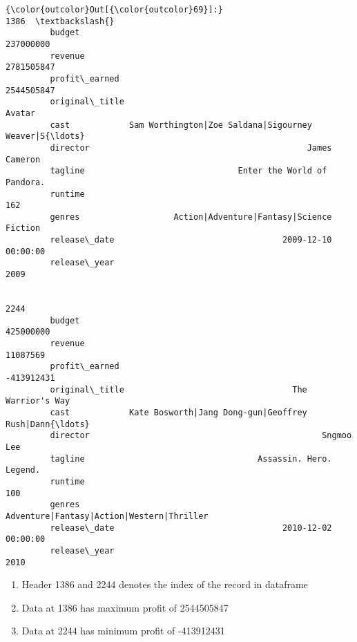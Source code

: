 \documentclass[11pt]{article}
\providecommand{\tightlist}{%
      \setlength{\itemsep}{0pt}\setlength{\parskip}{0pt}}
\begin{document}
\begin{Verbatim}[commandchars=\\\{\}]
{\color{outcolor}Out[{\color{outcolor}69}]:}                                                              1386  \textbackslash{}
         budget                                                  237000000   
         revenue                                                2781505847   
         profit\_earned                                          2544505847   
         original\_title                                             Avatar   
         cast            Sam Worthington|Zoe Saldana|Sigourney Weaver|S{\ldots}   
         director                                            James Cameron   
         tagline                               Enter the World of Pandora.   
         runtime                                                       162   
         genres                   Action|Adventure|Fantasy|Science Fiction   
         release\_date                                  2009-12-10 00:00:00   
         release\_year                                                 2009   
         
                                                                      2244  
         budget                                                  425000000  
         revenue                                                  11087569  
         profit\_earned                                          -413912431  
         original\_title                                  The Warrior's Way  
         cast            Kate Bosworth|Jang Dong-gun|Geoffrey Rush|Dann{\ldots}  
         director                                               Sngmoo Lee  
         tagline                                   Assassin. Hero. Legend.  
         runtime                                                       100  
         genres                  Adventure|Fantasy|Action|Western|Thriller  
         release\_date                                  2010-12-02 00:00:00  
         release\_year                                                 2010  
\end{Verbatim}
            
    \begin{enumerate}
\def\labelenumi{\arabic{enumi}.}
\tightlist
\item
  Header 1386 and 2244 denotes the index of the record in dataframe
\item
  Data at 1386 has maximum profit of 2544505847
\item
  Data at 2244 has minimum profit of -413912431
\end{enumerate}
\end{document}
